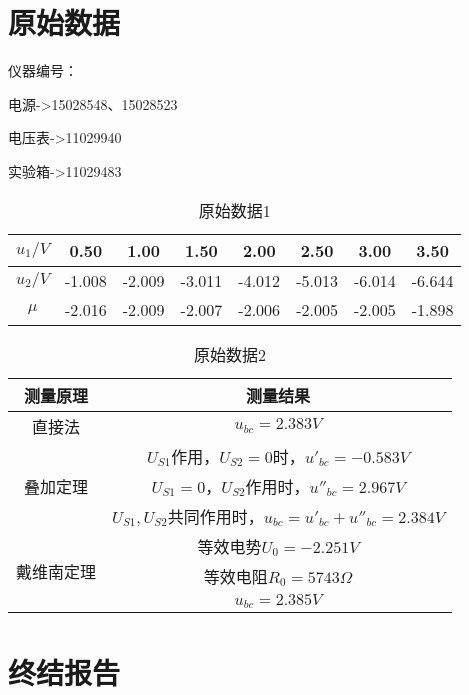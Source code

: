 \documentclass[12pt,a4paper,oneside,left=3.18,right=3.18,top=2.54,bottom=2.54]{ctexart}
\begin{document}
\section{原始数据}
	\noindent
	仪器编号：\par
	电源->15028548、15028523\par
	电压表->11029940\par
	实验箱->11029483\\
	\begin{table}[H]
	\centering
	\begin{tabular}{|c|c|c|c|c|c|c|c|}
	\hline
	$u_1/V$&0.50&1.00&1.50&2.00&2.50&3.00&3.50\\
	\hline
	$u_2/V$&-1.008&-2.009&-3.011&-4.012&-5.013&-6.014&-6.644\\
	\hline
	$\mu$&-2.016&-2.009&-2.007&-2.006&-2.005&-2.005&-1.898\\
	\hline
	\end{tabular}
	\caption{原始数据1}
	\label{table2}
	\end{table}
	\par
	\begin{table}[H]
	\centering
	\begin{tabular}{|c|c|}
	\hline
	测量原理&测量结果\\
	\hline
	直接法&$u_{bc}=2.383V$\\
	\hline
	\multirow{3}{*}{叠加定理}&$U_{S1}$作用，$U_{S2}=0$时，$u'_{bc}=-0.583V$\\
	\multirow{3}{*}{}&$U_{S1}=0$，$U_{S2}$作用时，$u''_{bc}=2.967V$\\
	\multirow{3}{*}{}&$U_{S1},U_{S2}$共同作用时，$u_{bc}=u'_{bc}+u''_{bc}=2.384V$\\
	\hline
	\multirow{3}{*}{戴维南定理}&等效电势$U_{0}=-2.251V$\\
	\multirow{3}{*}{}&等效电阻$R_{0}=5743\Omega$\\
	\multirow{3}{*}{}&$u_{bc}=2.385V$\\
	\hline
	\end{tabular}
	\caption{原始数据2}
	\label{table3}
	\end{table}
	\par
\section{终结报告}
\end{document}
